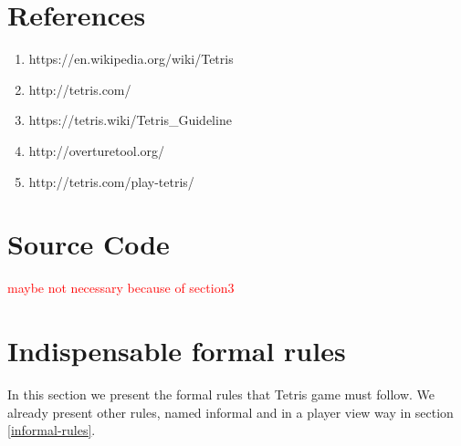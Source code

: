 \documentclass[a4paper]{article}
\begin{document}
\section{References}

\begin{enumerate}
	
\item https://en.wikipedia.org/wiki/Tetris
\item http://tetris.com/
\item https://tetris.wiki/Tetris\_Guideline
\item http://overturetool.org/
\item http://tetris.com/play-tetris/

\end{enumerate}

\newpage
\appendix
\section{Source Code}
\textcolor{red}{maybe not necessary because of section3}

\section{Indispensable formal rules}\label{rules}
In this section we present the formal rules that Tetris game must follow. We already present other rules, named informal and in a player view way in section \ref{informal-rules}.
\end{document}
